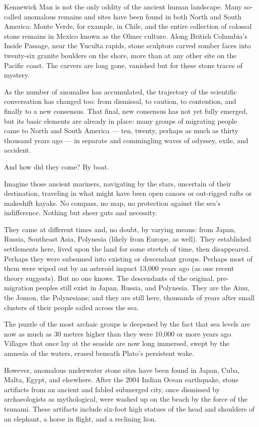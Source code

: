 \documentclass[letterpaper,oneside]{memoir}
\begin{document}
\begin{description}
Kennewick Man is not the only oddity of the ancient human landscape.
Many so-called anomalous remains and sites have been found in both
North and South America: Monte Verde, for example, in Chile, and the
entire collection of colossal stone remains in Mexico known as the
Olmec culture. Along British Columbia's Inside Passage, near the
Yuculta rapids, stone sculptors carved somber faces into twenty-six
granite boulders on the shore, more than at any other site on the
Pacific coast. The carvers are long gone, vanished but for these stone
traces of mystery.

As the number of anomalies has accumulated, the trajectory of the
scientific conversation has changed too: from dismissal, to caution,
to contention, and finally to a new consensus. That final, new
consensus has not yet fully emerged, but its basic elements are
already in place: many groups of migrating people came to North and
South America --- ten, twenty, perhaps as much as thirty thousand years
ago --- in separate and commingling waves of odyssey, exile, and
accident.

And how did they come? By boat.

Imagine those ancient mariners, navigating by the stars, uncertain of
their destination, traveling in what might have been open canoes or
out-rigged rafts or makeshift kayaks. No compass, no map, no
protection against the sea's indifference. Nothing but sheer guts and
necessity.

They came at different times and, no doubt, by varying means: from
Japan, Russia, Southeast Asia, Polynesia (likely from Europe, as
well). They established settlements here, lived upon the land for some
stretch of time, then disappeared. Perhaps they were subsumed into
existing or descendant groups. Perhaps most of them were wiped out by
an asteroid impact 13,000 years ago (as one recent theory suggests).
But no one knows. The descendants of the original, pre-migration
peoples still exist in Japan, Russia, and Polynesia. They are the
Ainu, the Jomon, the Polynesians; and they are still here, thousands
of years after small clusters of their people sailed across the sea.

The puzzle of the most archaic groups is deepened by the fact that sea
levels are now as much as 30 metres higher than they were 10,000 or
more years ago. Villages that once lay at the seaside are now long
immersed, swept by the amnesia of the waters, erased beneath Plato's
persistent wake.

However, anomalous underwater stone sites have been found in Japan,
Cuba, Malta, Egypt, and elsewhere. After the 2004 Indian Ocean
earthquake, stone artifacts from an ancient and fabled submerged city,
once dismissed by archaeologists as mythological, were washed up on
the beach by the force of the tsunami. These artifacts include
six-foot high statues of the head and shoulders of an elephant, a
horse in flight, and a reclining lion.


\end{description}
\end{document}
